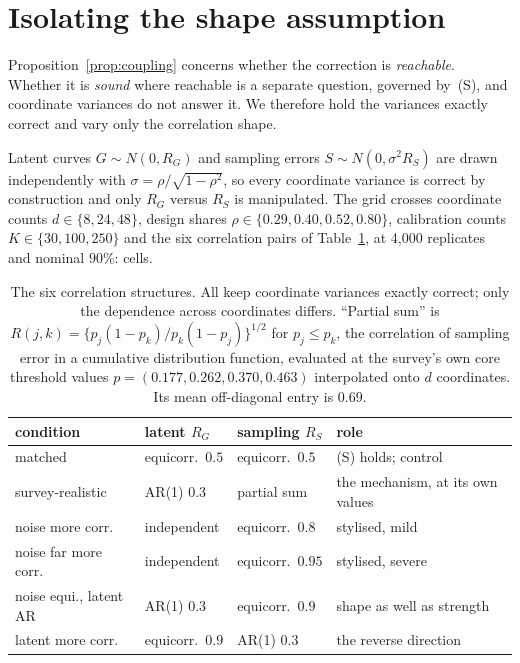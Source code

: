 \section{Isolating the shape assumption}\label{sec:simulation}

Proposition~\ref{prop:coupling} concerns whether the correction is
\emph{reachable}. Whether it is \emph{sound} where reachable is a separate
question, governed by~(S), and coordinate variances do not answer it. We
therefore hold the variances exactly correct and vary only the correlation
shape.

Latent curves $G\sim N(0,R_G)$ and sampling errors $S\sim N(0,\sigma^2R_S)$ are
drawn independently with $\sigma=\rho/\sqrt{1-\rho^2}$, so every coordinate
variance is correct by construction and only $R_G$ versus $R_S$ is manipulated.
The grid crosses coordinate counts $d\in\{8,24,48\}$, design shares
$\rho\in\{0.29,0.40,0.52,0.80\}$, calibration counts $K\in\{30,100,250\}$ and
the six correlation pairs of Table~\ref{tab:shapespec}, at 4{,}000 replicates
and nominal $90\%$: \ShapeCells{} cells.

\begin{table}[htbp]\centering
\caption{The six correlation structures. All keep coordinate variances exactly
correct; only the dependence across coordinates differs. ``Partial sum'' is
$R(j,k)=\{p_j(1-p_k)/p_k(1-p_j)\}^{1/2}$ for $p_j\le p_k$, the correlation of
sampling error in a cumulative distribution function, evaluated at the survey's
own core threshold values $p=(0.177,0.262,0.370,0.463)$ interpolated onto $d$
coordinates. Its mean off-diagonal entry is $0.69$.}\label{tab:shapespec}
\begin{tabular}{llll}\toprule
condition & latent $R_G$ & sampling $R_S$ & role\\\midrule
matched & equicorr.\ $0.5$ & equicorr.\ $0.5$ & (S) holds; control\\
survey-realistic & AR(1) $0.3$ & partial sum & the mechanism, at its own values\\
noise more corr. & independent & equicorr.\ $0.8$ & stylised, mild\\
noise far more corr. & independent & equicorr.\ $0.95$ & stylised, severe\\
noise equi., latent AR & AR(1) $0.3$ & equicorr.\ $0.9$ & shape as well as strength\\
latent more corr. & equicorr.\ $0.9$ & AR(1) $0.3$ & the reverse direction\\
\bottomrule\end{tabular}
\end{table}

